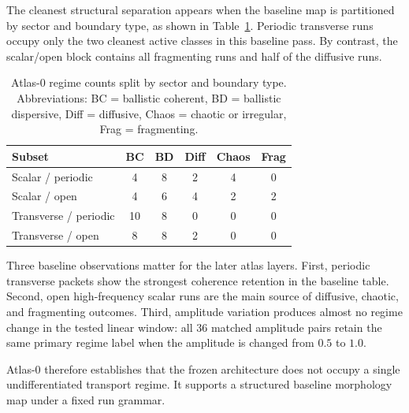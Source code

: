 \documentclass[11pt]{article}
\begin{document}
The cleanest structural separation appears when the baseline map is partitioned by sector and boundary type, as shown in Table~\ref{tab:atlas0-sector-boundary}. Periodic transverse runs occupy only the two cleanest active classes in this baseline pass. By contrast, the scalar/open block contains all fragmenting runs and half of the diffusive runs.

\begin{table}[t]
\centering
\begin{tabular}{lccccc}
\hline
Subset & BC & BD & Diff & Chaos & Frag \\
\hline
Scalar / periodic & 4 & 8 & 2 & 4 & 0 \\
Scalar / open & 4 & 6 & 4 & 2 & 2 \\
Transverse / periodic & 10 & 8 & 0 & 0 & 0 \\
Transverse / open & 8 & 8 & 2 & 0 & 0 \\
\hline
\end{tabular}
\caption{Atlas-0 regime counts split by sector and boundary type. Abbreviations: BC = ballistic coherent, BD = ballistic dispersive, Diff = diffusive, Chaos = chaotic or irregular, Frag = fragmenting.}
\label{tab:atlas0-sector-boundary}
\end{table}

Three baseline observations matter for the later atlas layers.
First, periodic transverse packets show the strongest coherence retention in the baseline table.
Second, open high-frequency scalar runs are the main source of diffusive, chaotic, and fragmenting outcomes.
Third, amplitude variation produces almost no regime change in the tested linear window: all 36 matched amplitude pairs retain the same primary regime label when the amplitude is changed from $0.5$ to $1.0$.

Atlas-0 therefore establishes that the frozen architecture does not occupy a single undifferentiated transport regime. It supports a structured baseline morphology map under a fixed run grammar.
\end{document}
